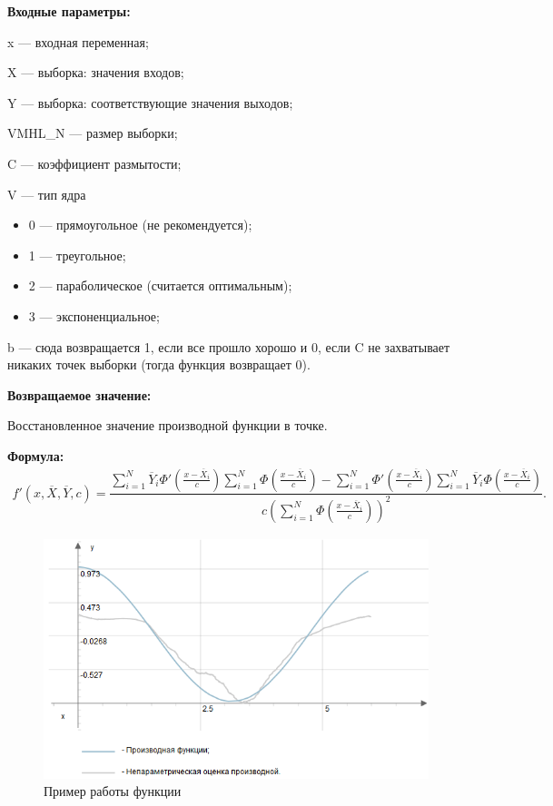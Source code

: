 \textbf{Входные параметры:} 
 
x --- входная переменная;
 
X --- выборка: значения входов;
 
Y --- выборка: соответствующие значения выходов;
 
VMHL\_N --- размер выборки;
 
C --- коэффициент размытости;
 
V --- тип ядра
 
 \begin{itemize}
 \item  0 --- прямоугольное (не рекомендуется);
 \item  1 --- треугольное;
 \item  2 --- параболическое (считается оптимальным);
 \item  3 --- экспоненциальное;
 \end{itemize}
 
b --- сюда возвращается 1, если все прошло хорошо и 0, если C не захватывает никаких точек выборки (тогда функция возвращает 0).

\textbf{Возвращаемое значение:}
 
 Восстановленное значение производной функции в точке.

\textbf{Формула:}
\begin{eqnarray*}
{f}'\left( x, \overline{X},\overline{Y}, c\right) =\dfrac{\sum_{i=1}^{N}\overline{Y}_i{\Phi}'\left( \frac{x-\overline{X}_i}{c}\right) \sum_{i=1}^{N}\Phi\left( \frac{x-\overline{X}_i}{c}\right)-\sum_{i=1}^{N}{\Phi}'\left( \frac{x-\overline{X}_i}{c}\right) \sum_{i=1}^{N}\overline{Y}_i\Phi\left( \frac{x-\overline{X}_i}{c}\right)}{c\left( \sum_{i=1}^{N}\Phi\left( \frac{x-\overline{X}_i}{c}\right)\right)^2 }.
\end{eqnarray*}

 \begin{figure} [h] 
   \center
   \includegraphics {MHL_NonparametricEstimatorOfDerivative.png}
   \caption{Пример работы функции} 
   \label{img:MHL_NonparametricEstimatorOfDerivative}  
 \end{figure}